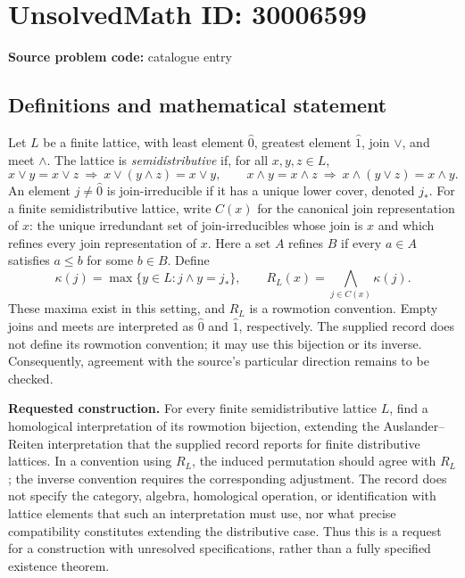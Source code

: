 \documentclass[11pt]{article}
\begin{document}
\section*{UnsolvedMath ID: 30006599}
\textbf{Source problem code:} catalogue entry
\subsection{Definitions and mathematical statement}
Let \(L\) be a finite lattice, with least element \(\hat 0\), greatest element \(\hat 1\), join \(\vee\), and meet \(\wedge\). The lattice is \emph{semidistributive} if, for all \(x,y,z\in L\),
\[
 x\vee y=x\vee z\ \Longrightarrow\ x\vee(y\wedge z)=x\vee y,
 \qquad
 x\wedge y=x\wedge z\ \Longrightarrow\ x\wedge(y\vee z)=x\wedge y.
\]
An element \(j\ne\hat 0\) is join-irreducible if it has a unique lower cover, denoted \(j_*\). For a finite semidistributive lattice, write \(C(x)\) for the canonical join representation of \(x\): the unique irredundant set of join-irreducibles whose join is \(x\) and which refines every join representation of \(x\). Here a set \(A\) refines \(B\) if every \(a\in A\) satisfies \(a\le b\) for some \(b\in B\). Define
\[
 \kappa(j)=\max\{y\in L:j\wedge y=j_*\},
 \qquad
 R_L(x)=\bigwedge_{j\in C(x)}\kappa(j).
\]
These maxima exist in this setting, and \(R_L\) is a rowmotion convention. Empty joins and meets are interpreted as \(\hat 0\) and \(\hat 1\), respectively. The supplied record does not define its rowmotion convention; it may use this bijection or its inverse. Consequently, agreement with the source's particular direction remains to be checked.

\textbf{Requested construction.} For every finite semidistributive lattice \(L\), find a homological interpretation of its rowmotion bijection, extending the Auslander--Reiten interpretation that the supplied record reports for finite distributive lattices. In a convention using \(R_L\), the induced permutation should agree with \(R_L\); the inverse convention requires the corresponding adjustment. The record does not specify the category, algebra, homological operation, or identification with lattice elements that such an interpretation must use, nor what precise compatibility constitutes extending the distributive case. Thus this is a request for a construction with unresolved specifications, rather than a fully specified existence theorem.
\end{document}
